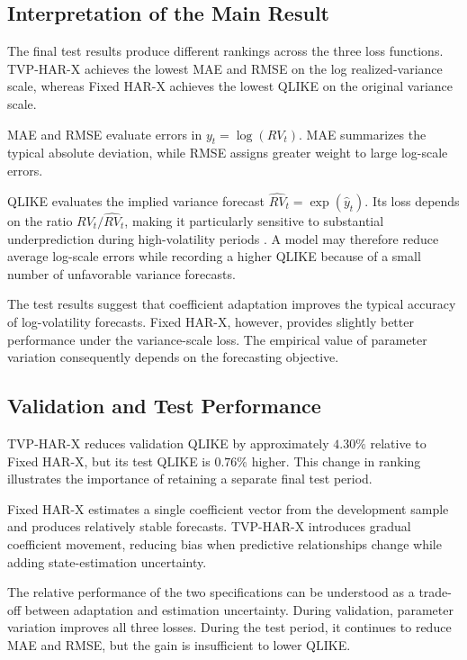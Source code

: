 \subsection{Interpretation of the Main Result}

The final test results produce different rankings across the
three loss functions. TVP-HAR-X achieves the lowest MAE and
RMSE on the log realized-variance scale, whereas Fixed HAR-X
achieves the lowest QLIKE on the original variance scale.

MAE and RMSE evaluate errors in
\(y_t=\log(RV_t)\). MAE summarizes the typical absolute
deviation, while RMSE assigns greater weight to large
log-scale errors.

QLIKE evaluates the implied variance forecast
\(\widehat{RV}_t=\exp(\widehat{y}_t)\). Its loss depends on the
ratio \(RV_t/\widehat{RV}_t\), making it particularly sensitive
to substantial underprediction during high-volatility periods
\citep{patton2011}. A model may therefore reduce average
log-scale errors while recording a higher QLIKE because of a
small number of unfavorable variance forecasts.

The test results suggest that coefficient adaptation improves
the typical accuracy of log-volatility forecasts. Fixed HAR-X,
however, provides slightly better performance under the
variance-scale loss. The empirical value of parameter
variation consequently depends on the forecasting objective.

\subsection{Validation and Test Performance}

TVP-HAR-X reduces validation QLIKE by approximately \(4.30\%\)
relative to Fixed HAR-X, but its test QLIKE is \(0.76\%\)
higher. This change in ranking illustrates the importance of
retaining a separate final test period.

Fixed HAR-X estimates a single coefficient vector from the
development sample and produces relatively stable forecasts.
TVP-HAR-X introduces gradual coefficient movement, reducing
bias when predictive relationships change while adding
state-estimation uncertainty.

The relative performance of the two specifications can be
understood as a trade-off between adaptation and estimation
uncertainty. During validation, parameter variation improves
all three losses. During the test period, it continues to
reduce MAE and RMSE, but the gain is insufficient to lower
QLIKE.

